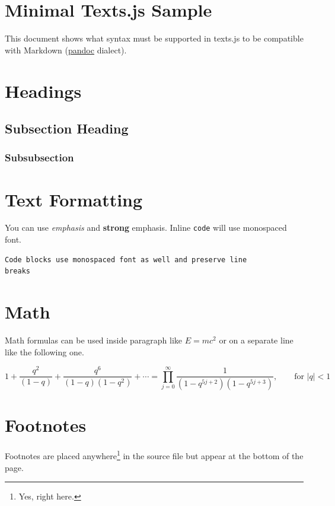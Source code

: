 \documentclass[10pt]{article}
\begin{document}
\section{Minimal Texts.js Sample}

This document shows what syntax must be supported in texts.js to be compatible
with Markdown (\href{http://johnmacfarlane.net/pandoc/}{pandoc} dialect).

\section{Headings}

\subsection{Subsection Heading}

\subsubsection{Subsubsection}

\section{Text Formatting}

You can use \emph{emphasis} and \textbf{strong} emphasis. Inline \texttt{code}
will use monospaced font.

\begin{verbatim}
Code blocks use monospaced font as well and preserve line
breaks
\end{verbatim}

\section{Math}

Math formulas can be used inside paragraph like $E=mc^2$ or on a separate line
like the following one.

\begin{equation}
1+\frac{q^2}{(1-q)}+\frac{q^6}{(1-q)(1-q^2)}+\cdots =
\prod_{j=0}^{\infty}\frac{1}{(1-q^{5j+2})(1-q^{5j+3})},
\quad\quad \text{for $|q|<1$}
\end{equation}

\section{Footnotes}

Footnotes are placed anywhere\footnote{Yes, right here.} in the source file but
appear at the bottom of the page.
\end{document}
